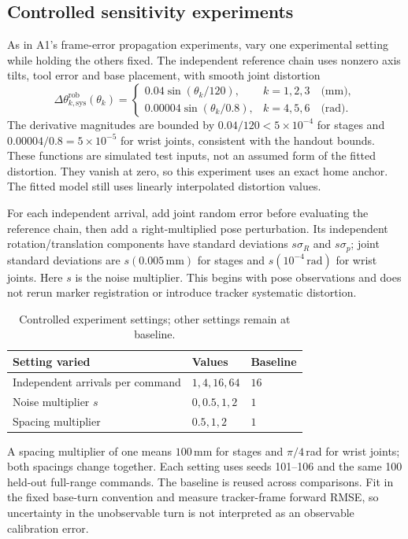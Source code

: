 \documentclass[../main.tex]{subfiles}
\begin{document}
\subsection{Controlled sensitivity experiments}\label{sec:controlled-sensitivity}
As in A1's frame-error propagation experiments, vary one experimental setting while holding the others fixed. The independent reference chain uses nonzero axis tilts, tool error and base placement, with smooth joint distortion
\begin{equation*}
\Delta\theta^{\mathrm{rob}}_{k,\mathrm{sys}}(\theta_k)=
\begin{cases}
0.04\sin(\theta_k/120),&k=1,2,3\quad\text{(mm)},\\
0.00004\sin(\theta_k/0.8),&k=4,5,6\quad\text{(rad)}.
\end{cases}
\end{equation*}
The derivative magnitudes are bounded by $0.04/120<5\times10^{-4}$ for stages and $0.00004/0.8=5\times10^{-5}$ for wrist joints, consistent with the handout bounds. These functions are simulated test inputs, not an assumed form of the fitted distortion. They vanish at zero, so this experiment uses an exact home anchor. The fitted model still uses linearly interpolated distortion values.

For each independent arrival, add joint random error before evaluating the reference chain, then add a right-multiplied pose perturbation. Its independent rotation/translation components have standard deviations $s\sigma_R$ and $s\sigma_p$; joint standard deviations are $s(0.005\,\mathrm{mm})$ for stages and $s(10^{-4}\,\mathrm{rad})$ for wrist joints. Here $s$ is the noise multiplier. This begins with pose observations and does not rerun marker registration or introduce tracker systematic distortion.

\begin{table}[H]
\centering\small
\caption{Controlled experiment settings; other settings remain at baseline.}
\begin{tabular}{@{}lll@{}}
\toprule
Setting varied & Values & Baseline \\\midrule
Independent arrivals per command & $1,4,16,64$ & $16$ \\
Noise multiplier $s$ & $0,0.5,1,2$ & $1$ \\
Spacing multiplier & $0.5,1,2$ & $1$ \\
\bottomrule
\end{tabular}
\end{table}
A spacing multiplier of one means $100$\,mm for stages and $\pi/4$\,rad for wrist joints; both spacings change together. Each setting uses seeds 101--106 and the same 100 held-out full-range commands. The baseline is reused across comparisons. Fit in the fixed base-turn convention and measure tracker-frame forward RMSE, so uncertainty in the unobservable turn is not interpreted as an observable calibration error.
\end{document}

